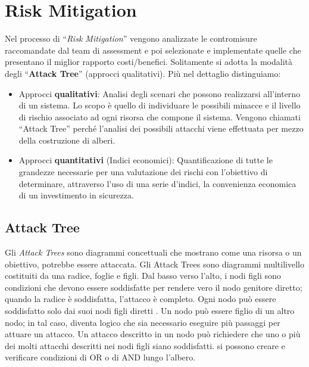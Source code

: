 \section{Risk Mitigation}

Nel processo di “\textit{Risk Mitigation}” vengono analizzate le contromisure
raccomandate dal team di
assessment e poi selezionate e implementate quelle che presentano il
miglior rapporto costi/benefici.
Solitamente si adotta la modalità degli “\textbf{Attack Tree}”
(approcci qualitativi).
Più nel dettaglio distinguiamo:

\begin{itemize}
    \item Approcci \textbf{qualitativi}: Analisi degli scenari che possono
          realizzarsi all'interno di un sistema.
          Lo scopo è quello di individuare le possibili minacce e il livello di
          rischio associato ad ogni
          risorsa che compone il sistema. Vengono chiamati “Attack Tree” perché
          l'analisi dei
          possibili attacchi viene effettuata per mezzo della costruzione di alberi.
    \item Approcci \textbf{quantitativi} (Indici economici): Quantificazione di
          tutte le grandezze necessarie
          per una valutazione dei rischi con l'obiettivo di determinare,
          attraverso l'uso di una serie
          d'indici, la convenienza economica di un investimento in sicurezza.
\end{itemize}

\subsection{Attack Tree}

Gli \textit{Attack Trees} sono diagrammi concettuali che mostrano come una risorsa
o un obiettivo, potrebbe essere
attaccata.
Gli Attack Trees sono diagrammi multilivello costituiti da una radice, foglie e
figli. Dal basso verso l'alto, i nodi
figli sono condizioni che devono essere soddisfatte per rendere vero il nodo
genitore diretto; quando la radice è
soddisfatta, l'attacco è completo. Ogni nodo può essere soddisfatto solo dai
suoi nodi figli diretti . Un nodo può
essere figlio di un altro nodo; in tal caso, diventa logico che sia necessario
eseguire più passaggi per attuare un
attacco. Un attacco descritto in un nodo può richiedere che uno o più dei molti
attacchi descritti nei nodi figli siano
soddisfatti. si possono creare e verificare condizioni di OR o di AND lungo
l'albero.

